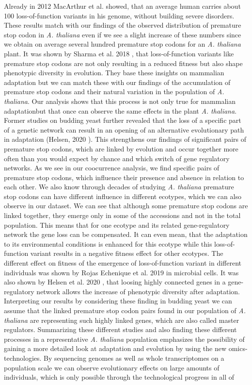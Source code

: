 Already in 2012 MacArthur et al. \cite{macarthur2012} showed, that an average human carries about 100 loss-of-function variants in his genome, without building severe disorders. These results match with our findings of the observed distribution of premature stop codon in \textit{A. thaliana} even if we see a slight increase of these numbers since we obtain on average several hundred premature stop codons for an \textit{A. thaliana} plant. It was shown by Sharma et al. 2018 \cite{Sharma2018}, that loss-of-function variants like premature stop codons are not only resulting in a reduced fitness but also shape phenotypic diversity in evolution. They base these insights on mammalian adaptation but we can match these with our findings of the accumulation of premature stop codons and their natural variation in the population of \textit{A. thaliana}. Our analysis shows that this process is not only true for mammalian adaptationbut that once can observe the same effects in the plant \textit{A. thaliana}. Former studies on budding yeast further revealed that the loss of a specific part of a genetic network can result in an opening of an alternative evolutionary path in adaptation (Helsen, 2020 \cite{Helsen2020}). This strengthens our findings of significant pairs of premature stop codons, which are linked by evolution and occur together more often than you would expect by chance and which switch of gene regulatory networks. As we see in our coocurrence analysis, we find specific pairs of premature stop codons, which influence their presence and absence in relation to each other. We also know through decades of studying \textit{A. thaliana} premature stop codons can have different influence in different ecotypes, which we can also observe in our dataset. We can see that although some premature stop codons are linked together, they emerge only in some of the accessions and not in the total population. This means that for one ecotype and its related gene-regulatory network the gene loss can be compensated. It can even mean, that the adaptation to its environmental conditions is enhanced for this ecotype while this loss-of-function variant results in a negative fitness effect for other ecotypes. The different effect on fitness  of the emergence of loss-of-function variant in different individuals was shown by Rojas Echenique et al. 2019 \cite{Echenique2019} in microbial cells. It was also shown by Helsen et al. 2020 \cite{Helsen2020}, that loosing highly connected genes in a gene-regulatory network allows the increase of phenotypic diversity after adaptation. Interpreting our results by considering these finding in budding yeast we can assume that the linked premature stop codon pairs found in our population of \textit{A. thaliana} are representing such highly linked genes, which are also called master regulators. Summarizing these different studies and also finding these different processes in a representative \textit{A. thaliana} population emphasizes the possibility of gaining a more detailed look at adaptation and evolution by using the new \grqq omics\grqq{}-technologies. By sequencing genomes as well as whole transcriptomes on a population scale we can observe evolutionary effects on large amounts of individuals, which is only possible through the technological progress in all of 
